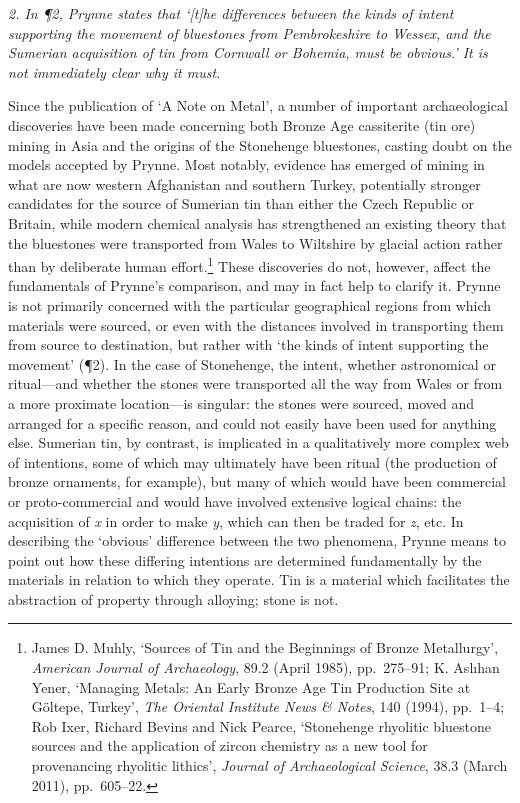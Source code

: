 \documentclass[]{article}
\begin{document}
\emph{2. In ¶2, Prynne states that ‘{[}t{]}he differences between the
kinds of intent supporting the movement of bluestones from Pembrokeshire
to Wessex, and the Sumerian acquisition of tin from Cornwall or Bohemia,
must be obvious.’ It is not immediately clear why it must.}

Since the publication of ‘A Note on Metal’, a number of important
archaeological discoveries have been made concerning both Bronze Age
cassiterite (tin ore) mining in Asia and the origins of the Stonehenge
bluestones, casting doubt on the models accepted by Prynne. Most
notably, evidence has emerged of mining in what are now western
Afghanistan and southern Turkey, potentially stronger candidates for the
source of Sumerian tin than either the Czech Republic or Britain, while
modern chemical analysis has strengthened an existing theory that the
bluestones were transported from Wales to Wiltshire by glacial action
rather than by deliberate human effort.\footnote{James D. Muhly,
  ‘Sources of Tin and the Beginnings of Bronze Metallurgy’,
  \emph{American Journal of Archaeology}, 89.2 (April 1985), pp.~275–91;
  K. Aslıhan Yener, ‘Managing Metals: An Early Bronze Age Tin Production
  Site at Göltepe, Turkey’, \emph{The Oriental Institute News \& Notes},
  140 (1994), pp.~1–4; Rob Ixer, Richard Bevins and Nick Pearce,
  ‘Stonehenge rhyolitic bluestone sources and the application of zircon
  chemistry as a new tool for provenancing rhyolitic lithics’,
  \emph{Journal of Archaeological Science}, 38.3 (March 2011),
  pp.~605–22.} These discoveries do not, however, affect the
fundamentals of Prynne’s comparison, and may in fact help to clarify it.
Prynne is not primarily concerned with the particular geographical
regions from which materials were sourced, or even with the distances
involved in transporting them from source to destination, but rather
with ‘the kinds of intent supporting the movement’ (¶2). In the case of
Stonehenge, the intent, whether astronomical or ritual—and whether the
stones were transported all the way from Wales or from a more proximate
location—is singular: the stones were sourced, moved and arranged for a
specific reason, and could not easily have been used for anything else.
Sumerian tin, by contrast, is implicated in a qualitatively more complex
web of intentions, some of which may ultimately have been ritual (the
production of bronze ornaments, for example), but many of which would
have been commercial or proto-commercial and would have involved
extensive logical chains: the acquisition of \emph{x} in order to make
\emph{y}, which can then be traded for \emph{z}, etc. In describing the
‘obvious’ difference between the two phenomena, Prynne means to point
out how these differing intentions are determined fundamentally by the
materials in relation to which they operate. Tin is a material which
facilitates the abstraction of property through alloying; stone is not.
\end{document}
